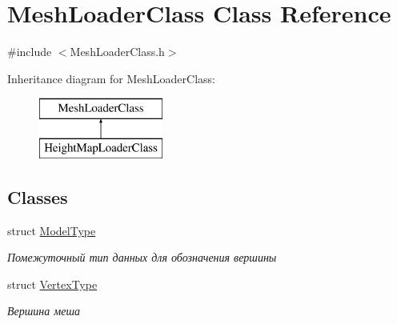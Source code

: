 \hypertarget{class_mesh_loader_class}{}\section{Mesh\+Loader\+Class Class Reference}
\label{class_mesh_loader_class}


{\ttfamily \#include $<$Mesh\+Loader\+Class.\+h$>$}

Inheritance diagram for Mesh\+Loader\+Class\+:\begin{figure}[H]
\begin{center}
\leavevmode
\includegraphics[height=2.000000cm]{class_mesh_loader_class}
\end{center}
\end{figure}
\subsection*{Classes}
\begin{DoxyCompactItemize}
\item 
struct \hyperlink{struct_mesh_loader_class_1_1_model_type}{Model\+Type}
\begin{DoxyCompactList}\small\item\em Помежуточный тип данных для обозначения вершины \end{DoxyCompactList}\item 
struct \hyperlink{struct_mesh_loader_class_1_1_vertex_type}{Vertex\+Type}
\begin{DoxyCompactList}\small\item\em Вершина меша \end{DoxyCompactList}\end{DoxyCompactItemize}
